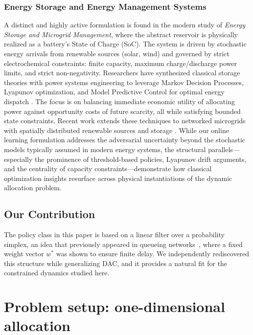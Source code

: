 \documentclass[11pt]{article}
\begin{document}
\subsubsection{Energy Storage and Energy Management Systems}
A distinct and highly active formulation is found in the modern study of \emph{Energy Storage and Microgrid Management}, where the abstract reservoir is physically realized as a battery's State of Charge (SoC). The system is driven by stochastic energy arrivals from renewable sources (solar, wind) and governed by strict electrochemical constraints: finite capacity, maximum charge/discharge power limits, and strict non-negativity. Researchers have synthesized classical storage theories with power systems engineering to leverage Markov Decision Processes, Lyapunov optimization, and Model Predictive Control for optimal energy dispatch \cite{sudevalayam2011energy,urgaonkar2011optimal,ozel2011optimal}. The focus is on balancing immediate economic utility of allocating power against opportunity costs of future scarcity, all while satisfying bounded state constraints. Recent work extends these techniques to networked microgrids with spatially distributed renewable sources and storage \cite{sun2014real,yang2011optimal}. While our online learning formulation addresses the adversarial uncertainty beyond the stochastic models typically assumed in modern energy systems, the structural parallels---especially the prominence of threshold-based policies, Lyapunov drift arguments, and the centrality of capacity constraints---demonstrate how classical optimization insights resurface across physical instantiations of the dynamic allocation problem.

\subsection{Our Contribution}
The policy class in this paper is based on a linear filter over a probability simplex, an idea that previously appeared in queueing networks~\cite{1354603}, where a fixed weight vector \(w^*\) was shown to ensure finite delay. We independently rediscovered this structure while generalizing DAC, and it provides a natural fit for the constrained dynamics studied here.




\section{Problem setup: one-dimensional allocation}
\end{document}
